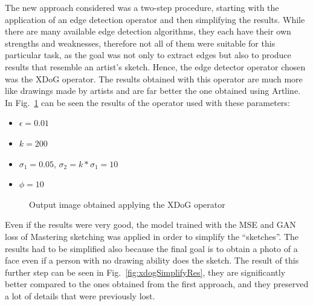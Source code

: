 \noindent The new approach considered was a two-step procedure, starting with the application of an edge detection operator and then simplifying the results. While there are many available edge detection algorithms, they each have their own strengths and weaknesses, therefore not all of them were suitable for this particular task, as the goal was not only to extract edges but also to produce results that resemble an artist’s sketch. Hence, the edge detector operator chosen was the XDoG operator. The results obtained with this operator are much more like drawings made by artists and are far better the one obtained using Artline. In Fig.~\ref{fig:xdogRes} can be seen the results of the operator used with these parameters:
\begin{itemize}
\setlength{\itemsep}{1pt}
\setlength{\parskip}{0pt}
\setlength{\parsep}{0pt}
    \item $\epsilon = 0.01$
    \item $k = 200$
    \item $\sigma_1 = 0.05$,  $\sigma_2=k * \sigma_1 = 10$
    \item $\phi = 10$
\end{itemize}

\begin{figure}[htbp]
    \centering
     \quad
    \caption{Output image obtained applying the XDoG operator}
    \label{fig:xdogRes}
\end{figure}

\noindent Even if the results were very good, the model trained with the MSE and GAN loss of Mastering sketching was applied in order to simplify the “sketches”. The results had to be simplified also because the final goal is to obtain a photo of a face even if a person with no drawing ability does the sketch.
The result of this further step can be seen in Fig.~\ref{fig:xdogSimplifyRes}, they are significantly better compared to the ones obtained from the first approach, and they preserved a lot of details that were previously lost. 

